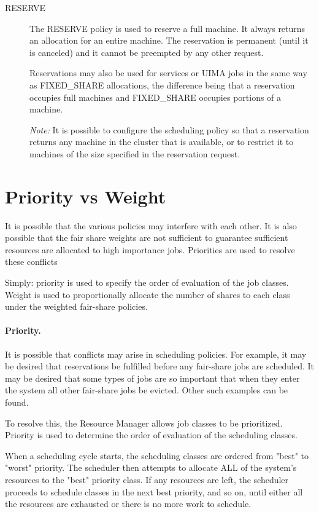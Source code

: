 \begin{description}
        \item[RESERVE] The RESERVE policy is used to reserve a full machine. It always returns an
          allocation for an entire machine. The reservation is permanent (until it is canceled) and
          it cannot be preempted by any other request.

          Reservations may also be used for services or UIMA jobs in the same way as FIXED\_SHARE 
          allocations, the difference being that a reservation occupies full machines and FIXED\_SHARE
          occupies portions of a machine.

          {\em Note:} It is possible to configure the scheduling policy so that a reservation returns any machine in 
          the cluster that is available, or to restrict it to machines of the size specified in the reservation 
          request. 
    \end{description}
    
    \section{Priority vs Weight}

    It is possible that the various policies may interfere with each other. It is also possible that
    the fair share weights are not sufficient to guarantee sufficient resources are allocated to
    high importance jobs. Priorities are used to resolve these conflicts

    Simply: priority is used to specify the order of evaluation of the job classes. Weight is used
    to proportionally allocate the number of shares to each class under the weighted fair-share
    policies.

    \paragraph{Priority.} It is possible that conflicts may arise in scheduling policies. For example, it may be
    desired that reservations be fulfilled before any fair-share jobs are scheduled. It may be
    desired that some types of jobs are so important that when they enter the system all other
    fair-share jobs be evicted. Other such examples can be found.
    
    To resolve this, the Resource Manager allows job classes to be prioritized. Priority is
    used to determine the order of evaluation of the scheduling classes.
    
    When a scheduling cycle starts, the scheduling classes are ordered from "best" to "worst" priority. 
    The scheduler then attempts to allocate ALL of the system's resources to the "best" priority class. 
    If any resources are left, the scheduler proceeds to schedule classes in the next best
    priority, and so on, until either all the 
    resources are exhausted or there is no more work to schedule. 
    
